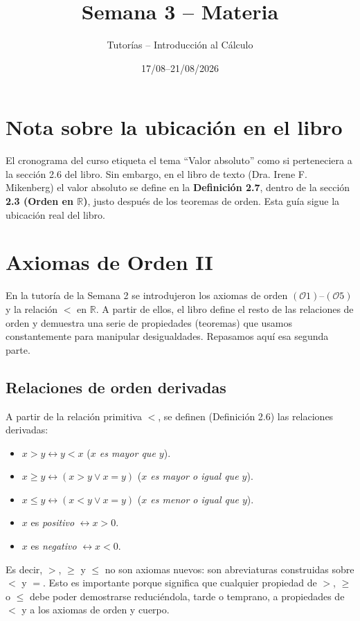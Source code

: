 \documentclass[11pt]{article}
\title{Semana 3 -- Materia}
\author{Tutorías -- Introducción al Cálculo}
\date{17/08--21/08/2026}
\theoremstyle{plain}
\theoremstyle{definition}
\begin{document}
\maketitle

\section*{Nota sobre la ubicación en el libro}
El cronograma del curso etiqueta el tema ``Valor absoluto'' como si perteneciera a la sección 2.6
del libro. Sin embargo, en el libro de texto (Dra. Irene F. Mikenberg) el valor absoluto se define
en la \textbf{Definición 2.7}, dentro de la sección \textbf{2.3 (Orden en $\mathbb{R}$)}, justo después
de los teoremas de orden. Esta guía sigue la ubicación real del libro.

\section{Axiomas de Orden II}

En la tutoría de la Semana 2 se introdujeron los axiomas de orden $(\mathcal{O}1)$--$(\mathcal{O}5)$
y la relación $<$ en $\mathbb{R}$. A partir de ellos, el libro define el resto de las relaciones de
orden y demuestra una serie de propiedades (teoremas) que usamos constantemente para manipular
desigualdades. Repasamos aquí esa segunda parte.

\subsection{Relaciones de orden derivadas}

A partir de la relación primitiva $<$, se definen (Definición 2.6) las relaciones derivadas:
\begin{itemize}[nosep]
  \item $x > y \leftrightarrow y < x$ \quad (\emph{$x$ es mayor que $y$}).
  \item $x \ge y \leftrightarrow (x > y \lor x = y)$ \quad (\emph{$x$ es mayor o igual que $y$}).
  \item $x \le y \leftrightarrow (x < y \lor x = y)$ \quad (\emph{$x$ es menor o igual que $y$}).
  \item $x$ es \emph{positivo} $\leftrightarrow x > 0$.
  \item $x$ es \emph{negativo} $\leftrightarrow x < 0$.
\end{itemize}

Es decir, $>$, $\ge$ y $\le$ no son axiomas nuevos: son abreviaturas construidas sobre $<$ y $=$.
Esto es importante porque significa que cualquier propiedad de $>$, $\ge$ o $\le$ debe poder
demostrarse reduciéndola, tarde o temprano, a propiedades de $<$ y a los axiomas de orden y cuerpo.
\end{document}
